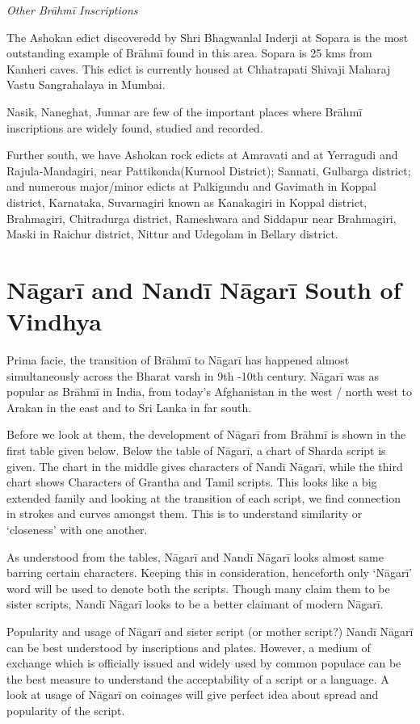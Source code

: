 \textit{Other Brāhmī Inscriptions}

The Ashokan edict discoveredd by Shri Bhagwanlal Inderji at Sopara is the most outstanding example of Brāhmī found in this area. Sopara is 25 kms from Kanheri caves. This edict is currently housed at Chhatrapati Shivaji Maharaj Vastu Sangrahalaya in Mumbai.

Nasik, Naneghat, Junnar are few of the important places where Brāhmī inscriptions are widely found, studied and recorded.

Further south, we have Ashokan rock edicts at Amravati and at Yerragudi and Rajula-Mandagiri, near Pattikonda(Kurnool District); Sannati, Gulbarga district; and numerous major/minor edicts at Palkigundu and Gavimath in Koppal district, Karnataka, Suvarnagiri known as Kanakagiri in Koppal district, Brahmagiri, Chitradurga district, Rameshwara and Siddapur near Brahmagiri, Maski in Raichur district, Nittur and Udegolam in Bellary district.


\section*{Nāgarī and Nandī Nāgarī South of Vindhya}

Prima facie, the transition of Brāhmī to Nāgarī has happened almost simultaneously across the Bharat varsh in 9th -10th century. Nāgarī was as popular as Brāhmī in India, from today’s Afghanistan in the west / north west to Arakan in the east and to Sri Lanka in far south.

Before we look at them, the development of Nāgarī from Brāhmī is shown in the first table given below. Below the table of Nāgarī, a chart of Sharda script is given. The chart in the middle gives characters of Nandī Nāgarī, while the third chart shows Characters of Grantha and Tamil scripts. This looks like a big extended family and looking at the transition of each script, we find connection in strokes and curves amongst them. This is to understand similarity or ‘closeness’ with one another.

As understood from the tables, Nāgarī and Nandī Nāgarī looks almost same barring certain characters. Keeping this in consideration, henceforth only ‘Nāgarī’ word will be used to denote both the scripts. Though many claim them to be sister scripts, Nandī Nāgarī looks to be a better claimant of modern Nāgarī.

Popularity and usage of Nāgarī and sister script (or mother script?) Nandī Nāgarī can be best understood by inscriptions and plates. However, a medium of exchange which is officially issued and widely used by common populace can be the best measure to understand the acceptability of a script or a language. A look at usage of Nāgarī on coinages will give perfect idea about spread and popularity of the script.


